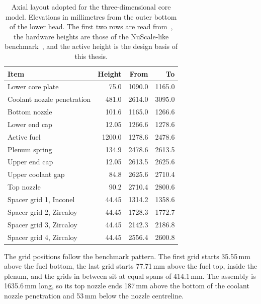\begin{table}[htbp]
  \centering
  \caption{Axial layout adopted for the three-dimensional core model.
    Elevations in millimetres from the outer bottom of the lower head.
    The first two rows are read from~\cite{maruyama_2013}, the hardware
    heights are those of the NuScale-like
    benchmark~\cite{ez_aldeen_2025}, and the active height is the
    design basis of this thesis.}
  \label{tab:axial-layout}
  \begin{tabular}{@{}lrrr@{}}
    \toprule
    \textbf{Item} & \textbf{Height} & \textbf{From} & \textbf{To} \\
    \midrule
    Lower core plate          &   75.0 & 1090.0 & 1165.0 \\
    Coolant nozzle penetration &  481.0 & 2614.0 & 3095.0 \\
    \addlinespace
    Bottom nozzle             &  101.6 & 1165.0 & 1266.6 \\
    Lower end cap             &   12.05 & 1266.6 & 1278.6 \\
    Active fuel               & 1200.0 & 1278.6 & 2478.6 \\
    Plenum spring             &  134.9 & 2478.6 & 2613.5 \\
    Upper end cap             &   12.05 & 2613.5 & 2625.6 \\
    Upper coolant gap         &   84.8 & 2625.6 & 2710.4 \\
    Top nozzle                &   90.2 & 2710.4 & 2800.6 \\
    \addlinespace
    Spacer grid 1, Inconel    &   44.45 & 1314.2 & 1358.6 \\
    Spacer grid 2, Zircaloy   &   44.45 & 1728.3 & 1772.7 \\
    Spacer grid 3, Zircaloy   &   44.45 & 2142.3 & 2186.8 \\
    Spacer grid 4, Zircaloy   &   44.45 & 2556.4 & 2600.8 \\
    \bottomrule
  \end{tabular}
\end{table}

The grid positions follow the benchmark pattern. The first grid starts
35.55\,mm above the fuel bottom, the last grid starts 77.71\,mm above
the fuel top, inside the plenum, and the grids in between sit at equal
spans of 414.1\,mm. The assembly is 1635.6\,mm long, so its top nozzle
ends 187\,mm above the bottom of the coolant nozzle penetration and
53\,mm below the nozzle centreline.
